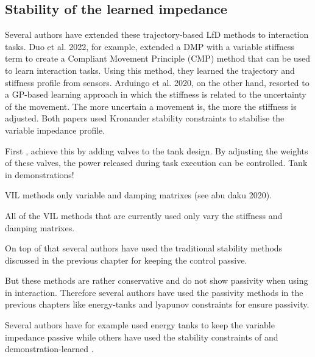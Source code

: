 \subsection{Stability of the learned impedance}


Several authors have extended these trajectory-based LfD methods to interaction tasks. Duo et al. 2022, for example, \cite{douRobotSkillLearning2022} extended a DMP with a variable stiffness term to create a Compliant Movement Principle (CMP) method that can be used to learn interaction tasks. Using this method, they learned the trajectory and stiffness profile from sensors. Arduingo et al. 2020, on the other hand, resorted to a GP-based learning approach in which the stiffness is related to the uncertainty of the movement. The more uncertain a movement is, the more the stiffness is adjusted. Both papers used Kronander stability constraints to stabilise the variable impedance profile.

First \cite{shahriariAdaptingContactsEnergy2017}, achieve this by adding valves to the tank design. By adjusting the weights of these valves, the power released during task execution can be controlled. Tank in demonstrations!

VIL methods only variable and damping matrixes (see abu daku 2020).

All of the VIL methods that are currently used only vary the stiffness and damping matrixes.

On top of that several authors have used the traditional stability methods discussed in the previous chapter for keeping the control passive.

But these methods are rather conservative and do not show passivity when using in interaction. Therefore several authors have used the passivity methods in the previous chapters like energy-tanks and lyapunov constraints for ensure passivity.

Several authors have for example used energy tanks to keep the variable impedance passive \cite{amanhoudForceAdaptationContact2020,enayatiVariableImpedanceForceControl2020,kastritsiProgressiveAutomationDMP2018,michelBilateralTeleoperationAdaptive2021,saverianoEnergybasedApproachEnsure2020,shahriariAdaptingContactsEnergy2017,wuFrameworkAutonomousImpedance2021,amanhoudDynamicalSystemApproach2019,kronanderPassiveInteractionControl2016} while others have used the stability constraints of and demonstration-learned \cite{arduengoGaussianProcessbasedRobotLearning2020,douRobotSkillLearning2022}.

